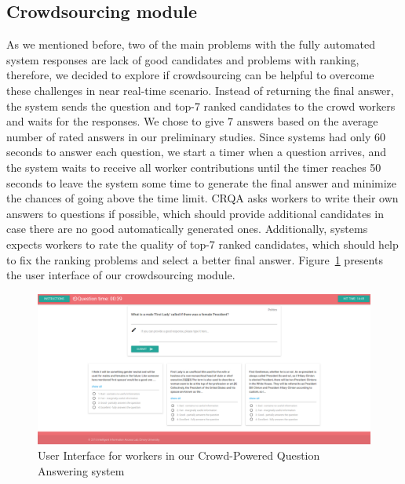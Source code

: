 \subsection{Crowdsourcing module}
\label{sec:system:crowd}

As we mentioned before, two of the main problems with the fully automated system responses are lack of good candidates and problems with ranking, therefore, we decided to explore if crowdsourcing can be helpful to overcome these challenges in near real-time scenario.
Instead of returning the final answer, the system sends the question and top-7 ranked candidates to the crowd workers and waits for the responses.
We chose to give 7 answers based on the average number of rated answers in our preliminary studies.
Since systems had only 60 seconds to answer each question, we start a timer when a question arrives, and the system waits to receive all worker contributions until the timer reaches 50 seconds to leave the system some time to generate the final answer and minimize the chances of going above the time limit.
CRQA asks workers to write their own answers to questions if possible, which should provide additional candidates in case there are no good automatically generated ones.
Additionally, systems expects workers to rate the quality of top-7 ranked candidates, which should help to fix the ranking problems and select a better final answer.
Figure~\ref{fig:crowd_ui} presents the user interface of our crowdsourcing module.

\begin{figure}[h!t]
	\centering
	\includegraphics[width=\textwidth]{img/crowd_ui}
	\caption{User Interface for workers in our Crowd-Powered Question Answering system}
	\label{fig:crowd_ui}
\end{figure}

